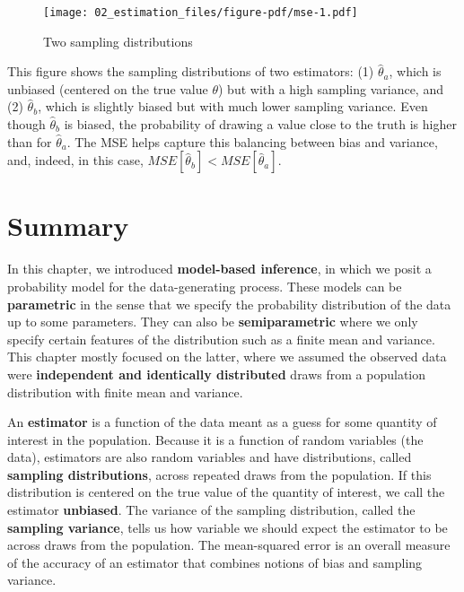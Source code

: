 \documentclass[
  letterpaper,
  DIV=11,
  numbers=noendperiod]{scrreprt}
\theoremstyle{plain}
\theoremstyle{definition}
\theoremstyle{definition}
\theoremstyle{remark}
\begin{document}
\begin{figure}[th]

{\centering \texttt{[image: 02\_estimation\_files/figure-pdf/mse-1.pdf]}

}

\caption{Two sampling distributions}

\end{figure}

This figure shows the sampling distributions of two estimators: (1)
\(\widehat{\theta}_a\), which is unbiased (centered on the true value
\(\theta\)) but with a high sampling variance, and (2)
\(\widehat{\theta}_b\), which is slightly biased but with much lower
sampling variance. Even though \(\widehat{\theta}_b\) is biased, the
probability of drawing a value close to the truth is higher than for
\(\widehat{\theta}_a\). The MSE helps capture this balancing between
bias and variance, and, indeed, in this case,
\(MSE[\widehat{\theta}_b] < MSE[\widehat{\theta}_a]\).

\hypertarget{summary-1}{%
\section{Summary}\label{summary-1}}

In this chapter, we introduced \textbf{model-based inference}, in which
we posit a probability model for the data-generating process. These
models can be \textbf{parametric} in the sense that we specify the
probability distribution of the data up to some parameters. They can
also be \textbf{semiparametric} where we only specify certain features
of the distribution such as a finite mean and variance. This chapter
mostly focused on the latter, where we assumed the observed data were
\textbf{independent and identically distributed} draws from a population
distribution with finite mean and variance.

An \textbf{estimator} is a function of the data meant as a guess for
some quantity of interest in the population. Because it is a function of
random variables (the data), estimators are also random variables and
have distributions, called \textbf{sampling distributions}, across
repeated draws from the population. If this distribution is centered on
the true value of the quantity of interest, we call the estimator
\textbf{unbiased}. The variance of the sampling distribution, called the
\textbf{sampling variance}, tells us how variable we should expect the
estimator to be across draws from the population. The mean-squared error
is an overall measure of the accuracy of an estimator that combines
notions of bias and sampling variance.
\end{document}
